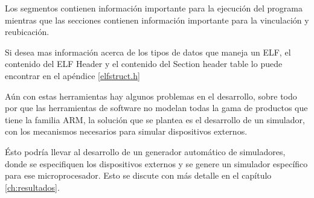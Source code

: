 Los segmentos contienen información importante para la ejecución del
programa mientras que las secciones contienen información importante
para la vinculación y reubicación.

Si desea mas información acerca de los tipos de datos que maneja un
\ac{ELF}, el contenido del \ac{ELF} Header y el contenido del Section
header table lo puede encontrar en el apéndice \ref{elfstruct.h}

Aún con estas herramientas hay algunos problemas en el desarrollo,
sobre todo por que las herramientas de software no modelan todas la
gama de productos que tiene la familia \ac{ARM}, la solución que
se plantea es el desarrollo de un simulador, con los mecanismos necesarios
para simular dispositivos externos.

Ésto podría llevar al desarrollo de un generador automático de simuladores,
donde se especifiquen los dispositivos externos y se genere un simulador
específico para ese microprocesador. Esto se discute con más detalle
en el capítulo \ref{ch:resultados}.



